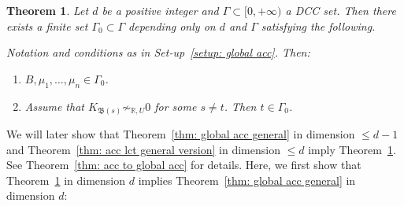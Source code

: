 \documentclass[11pt,reqno]{amsart}
\numberwithin{equation}{section}
\newcommand{\Bb}{{\mathfrak{B}}}
\newcommand{\Ii}{\Gamma}
\newtheorem{thm}{Theorem}[section]
\theoremstyle{definition}
\begin{document}
\begin{thm}\label{thm: picard number one case}
Let $d$ be a positive integer and $\Ii\subset [0,+\infty)$ a DCC set. Then there exists a finite set $\Ii_0\subset\Ii$ depending only on $d$ and $\Ii$ satisfying the following.

Notation and conditions as in Set-up~\ref{setup: global acc}. Then:
\begin{enumerate}
    \item $B,\mu_1,\dots,\mu_n\in\Ii_0$.
    \item Assume that $K_{\Bb(s)}\not\sim_{\mathbb R,U}0$ for some $s\neq t$. Then $t\in\Ii_0$.
\end{enumerate}
\end{thm}
We will later show that Theorem~\ref{thm: global acc general} in dimension $\leq d-1$ and Theorem~\ref{thm: acc lct general version} in dimension $\leq d$ imply Theorem~\ref{thm: picard number one case}. See Theorem~\ref{thm: acc to global acc} for details. Here, we first show that Theorem~\ref{thm: picard number one case} in dimension $d$ implies Theorem~\ref{thm: global acc general} in dimension $d$:
\end{document}

